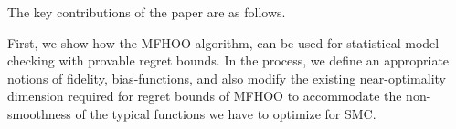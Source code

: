 \documentclass[11pt]{article}
\theoremstyle{definition}
\newcommand{\sayan}[1]{\textcolor{blue}{#1}}
\newcommand{\phit}[3]{{p_{#1,#2}{(#3)}}}
\newcommand{\Unsafe}{\mathcal{U}}
\newcommand{\modelname}{NiMC\xspace}
\begin{document}
%
%
%
%
%
%
%
%
%
%
%
%
%
%
%




The key contributions of the paper are as follows.

First, we show how the MFHOO algorithm, can be used for statistical model checking with provable regret bounds. In the process, we define an appropriate notions of fidelity, bias-functions, and also modify the existing near-optimality dimension required for regret bounds of MFHOO to accommodate the non-smoothness of the typical functions we have to optimize for SMC.
\end{document}
